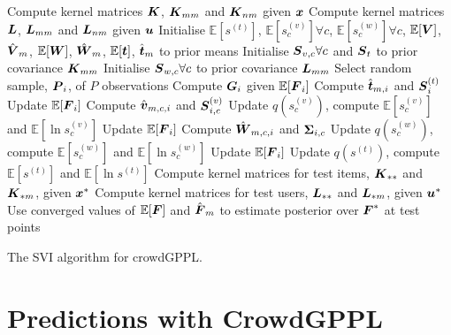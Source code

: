 \begin{algorithm}[h]
 \nl Compute kernel matrices $\boldsymbol K$, $\boldsymbol K_{mm}$ and $\boldsymbol K_{nm}$ given $\boldsymbol x$\;
 \nl Compute kernel matrices $\boldsymbol L$, $\boldsymbol L_{mm}$ and $\boldsymbol L_{nm}$ given $\boldsymbol u$\;
 \nl Initialise $\mathbb{E} \!\left[s^{(t)}\!\right]$, $\mathbb{E}\!\left[s^{(v)}_c\!\right]\forall c$, 
 $\mathbb{E}\!\left[s^{(w)}_c\!\right]\forall c$, $\mathbb{E}[\boldsymbol V]$, $\hat{\boldsymbol V}_m$,
 $\mathbb{E}[\boldsymbol W]$, $\hat{\boldsymbol W}_m$,
  $\mathbb{E}[\boldsymbol t]$, $\hat{\boldsymbol t}_m$ 
  to prior means\;
 \nl Initialise $\boldsymbol S_{v,c}\forall c$ and $\boldsymbol S_t$ to prior covariance $\boldsymbol K_{mm}$\;
\nl Initialise $\boldsymbol S_{w,c}\forall c$ to prior covariance $\boldsymbol L_{mm}$\;
 {
 \nl Select random sample, $\boldsymbol P_i$, of $P$ observations\;
  {
  \nl Compute $\boldsymbol G_i$ given $\mathbb{E}[\boldsymbol F_i]$ \;
  \nl Compute $\hat{\boldsymbol t}_{m,i}$ and $\boldsymbol S_{i}^{(t)}$ \;
  {
    \nl Update $\mathbb{E}[\boldsymbol F_i]$ \;
    \nl Compute $\hat{\boldsymbol v}_{m,c,i}$ and $\boldsymbol S_{i,c}^{(v)}$ \;
    \nl Update $q\left(s^{(v)}_c\right)$, compute $\mathbb{E}\left[s^{(v)}_c\right]$ and 
    $\mathbb{E}\left[\ln s^{(v)}_c\right]$\; 
    \nl Update $\mathbb{E}[\boldsymbol F_i]$ \;
    \nl Compute $\hat{\boldsymbol W}_{m,c,i}$ and $\boldsymbol \Sigma_{i,c}$ \;    
    \nl Update $q\left(s^{(w)}_c\right)$, compute $\mathbb{E}\left[s^{(w)}_c\right]$ 
    and $\mathbb{E}\left[\ln s^{(w)}_c\right]$\;
  }
  \nl Update $\mathbb{E}[\boldsymbol F_i]$ \;
 }
 \nl Update $q\left(s^{(t)}\right)$, compute $\mathbb{E}\left[s^{(t)}\right]$ and
 $\mathbb{E}\left[\ln s^{(t)}\right]$ \;
 }
\nl Compute kernel matrices for test items, $\boldsymbol K_{**}$ and $\boldsymbol K_{*m}$, given $\boldsymbol x^*$ \;
\nl Compute kernel matrices for test users, $\boldsymbol L_{**}$ and $\boldsymbol L_{*m}$, given $\boldsymbol u^*$ \;
\nl Use converged values of $\mathbb{E}[\boldsymbol F]$ and $\hat{\boldsymbol F}_m$ to estimate
posterior over $\boldsymbol F^*$ at test points \;
\vspace{0.5cm}
\caption{The SVI algorithm for crowdGPPL.}
\label{al:crowdgppl}
\end{algorithm}

\section{Predictions with CrowdGPPL}
\label{sec:predictions}

